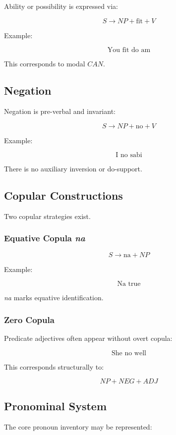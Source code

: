 \documentclass[12pt]{article}
\begin{document}
Ability or possibility is expressed via:

\[
S \rightarrow NP + \text{fit} + V
\]

Example:

\[
\text{You fit do am}
\]

This corresponds to modal \( CAN \).

\subsection{Negation}

Negation is pre-verbal and invariant:

\[
S \rightarrow NP + \text{no} + V
\]

Example:

\[
\text{I no sabi}
\]

There is no auxiliary inversion or do-support.

\subsection{Copular Constructions}

Two copular strategies exist.

\subsubsection*{Equative Copula \textit{na}}

\[
S \rightarrow \text{na} + NP
\]

Example:

\[
\text{Na true}
\]

\textit{na} marks equative identification.

\subsubsection*{Zero Copula}

Predicate adjectives often appear without overt copula:

\[
\text{She no well}
\]

This corresponds structurally to:

\[
NP + NEG + ADJ
\]

\subsection{Pronominal System}

The core pronoun inventory may be represented:
\end{document}
